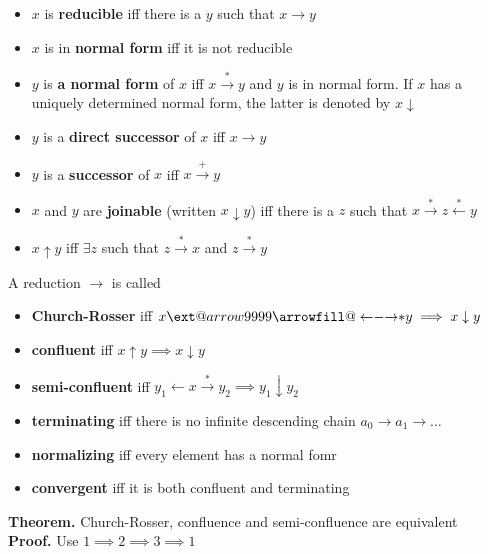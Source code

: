 \documentclass[titlepage, 12pt]{article}
\makeatletter
\newcommand\xleftrightarrow[2][]{%
\ext@arrow 9999{\longleftrightarrowfill@}{#1}{#2}}
\newcommand\longleftrightarrowfill@{%
\arrowfill@\leftarrow\relbar\rightarrow}
\makeatother
\begin{document}
\begin{itemize}

  \item $x$ is \textbf{reducible} iff there is a $y$ such that $x\rightarrow y$

  \item $x$ is in \textbf{normal form} iff it is not reducible

  \item $y$ is \textbf{a normal form} of $x$ iff $x\xrightarrow{*}y$ and $y$ is
    in normal form. If $x$ has a uniquely determined normal form, the latter is
    denoted by $x\downarrow$

  \item $y$ is a \textbf{direct successor} of $x$ iff $x\rightarrow y$

  \item $y$ is a \textbf{successor} of $x$ iff $x\xrightarrow{+}y$

  \item $x$ and $y$ are \textbf{joinable} (written $x\downarrow y$) iff there is a $z$ such that
    $x\xrightarrow{*}z\xleftarrow{*}y$

\item $x\uparrow y$ iff $\exists z$ such that $z\xrightarrow{*} x$ and
    $z\xrightarrow{*} y$

\end{itemize}

A reduction $\rightarrow$ is called

\begin{itemize}

  \item\textbf{Church-Rosser} iff $x\xleftrightarrow{*}y\implies x\downarrow y$

  \item\textbf{confluent} iff $x\uparrow y\implies x\downarrow y$

  \item\textbf{semi-confluent} iff $y_1\leftarrow x\xrightarrow{*}y_2\implies
    y_1\downarrow y_2$

  \item\textbf{terminating} iff there is no infinite descending chain
    $a_0\rightarrow a_1\rightarrow\dots$

  \item\textbf{normalizing} iff every element has a normal fomr

  \item\textbf{convergent} iff it is both confluent and terminating

\end{itemize}
\textbf{Theorem.} Church-Rosser, confluence and semi-confluence are equivalent\\
\textbf{Proof.} Use $1 \implies 2 \implies 3 \implies 1$
\end{document}
